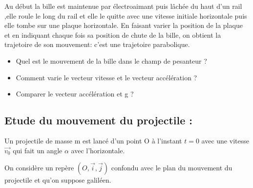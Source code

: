 \documentclass[12pt]{article}
\begin{document}
Au début la bille est maintenue par électroaimant puis lâchée du haut d’un rail ,elle roule le long du rail et elle le
quitte avec une vitesse initiale horizontale puis elle tombe sur une plaque horizontale.
En faisant varier la position de la plaque et en indiquant chaque fois sa position de chute de la bille, on obtient la
trajetoire de son mouvement: c'est une trajetoire parabolique.

\begin{itemize}
  \item Quel est le mouvement de la bille dans le champ de pesanteur ?
  \item Comment varie le vecteur vitesse et le vecteur accélération ?
  \item Comparer le vecteur accélération et g ?
\end{itemize}
\subsection{Etude du mouvement du projectile :}

Un projectile de masse m est lancé d'un point O à l'instant $t=0$ avec une vitesse $\vec{v_0}$ qui fait un angle $\alpha$ avec l'horizontale.

On considère un repère $(O, \vec{i}, \vec{j})$ confondu avec le plan du mouvement du projectile et qu'on suppose galiléen.
\end{document}
